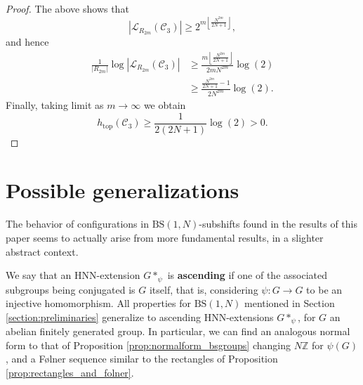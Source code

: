\documentclass{aims}
\newcommand{\BS}[1][N]{\mathrm{BS}(1,#1)}
\def\htop{h_{\mathrm{top}}}
\theoremstyle{definition}
\begin{document}
\begin{proof}
	
	The above shows that
	$$
	|\mathcal{L}_{R_{2m}}(\mathcal{C}_3)|\ge 2^{m\left\lfloor \frac{N^{2m}}{2N+1}\right\rfloor },
	$$
	and hence
	\begin{align*}
	\frac{1}{|R_{2m}|}\log |\mathcal{L}_{R_{2m}}(\mathcal{C}_3)|&\ge\frac{m\left\lfloor \frac{N^{2m}}{2N+1}\right\rfloor}{2mN^{2m}}\log(2) \\
	&\ge \frac{\frac{N^{2m}}{2N+1}-1}{2N^{2m}}\log(2).
	\end{align*}
	Finally, taking limit as $m\to\infty$ we obtain
	$$
	\htop(\mathcal{C}_3)\ge \frac{1}{2(2N+1)}\log(2)>0.
	$$
\end{proof}	

\section{Possible generalizations}
The behavior of configurations in $\BS$-subshifts found in the results of this paper seems to actually arise from more fundamental results, in a slighter abstract context.

We say that an HNN-extension $G*_{\psi}$ is \textbf{ascending} if one of the associated subgroups being conjugated is $G$ itself, that is, considering $\psi:G\to G$ to be an injective homomorphism. All properties for $\BS$ mentioned in Section \ref{section:preliminaries} generalize to ascending HNN-extensions $G*_{\psi}$, for $G$ an abelian finitely generated group. In particular, we can find an analogous normal form to that of Proposition \ref{prop:normalform_bsgroups} changing $N\mathbb{Z}$ for $\psi(G)$, and a F\o lner sequence similar to the rectangles of Proposition \ref{prop:rectangles_and_folner}.
\end{document}
